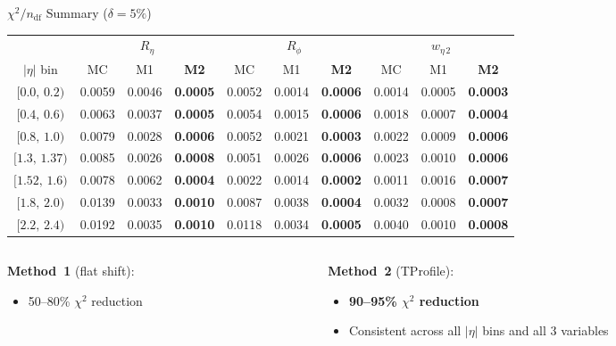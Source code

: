\documentclass[aspectratio=169,10pt]{beamer}
\begin{document}
\begin{frame}{$\chi^2/n_\text{df}$ Summary ($\delta = 5\%$)}

\centering
\small
\begin{tabular}{
  c
  c@{\hskip 6pt}c@{\hskip 6pt}c
  c@{\hskip 6pt}c@{\hskip 6pt}c
  c@{\hskip 6pt}c@{\hskip 6pt}c
}
\toprule
& \multicolumn{3}{c}{$R_\eta$}
& \multicolumn{3}{c}{$R_\phi$}
& \multicolumn{3}{c}{$w_{\eta\,2}$} \\
\cmidrule(lr){2-4}\cmidrule(lr){5-7}\cmidrule(lr){8-10}
$|\eta|$ bin & MC & M1 & \textbf{M2}
             & MC & M1 & \textbf{M2}
             & MC & M1 & \textbf{M2} \\
\midrule
$[0.0,\,0.2)$   & 0.0059 & 0.0046 & \textbf{0.0005} & 0.0052 & 0.0014 & \textbf{0.0006} & 0.0014 & 0.0005 & \textbf{0.0003} \\
$[0.4,\,0.6)$   & 0.0063 & 0.0037 & \textbf{0.0005} & 0.0054 & 0.0015 & \textbf{0.0006} & 0.0018 & 0.0007 & \textbf{0.0004} \\
$[0.8,\,1.0)$   & 0.0079 & 0.0028 & \textbf{0.0006} & 0.0052 & 0.0021 & \textbf{0.0003} & 0.0022 & 0.0009 & \textbf{0.0006} \\
$[1.3,\,1.37)$  & 0.0085 & 0.0026 & \textbf{0.0008} & 0.0051 & 0.0026 & \textbf{0.0006} & 0.0023 & 0.0010 & \textbf{0.0006} \\
$[1.52,\,1.6)$  & 0.0078 & 0.0062 & \textbf{0.0004} & 0.0022 & 0.0014 & \textbf{0.0002} & 0.0011 & 0.0016 & \textbf{0.0007} \\
$[1.8,\,2.0)$   & 0.0139 & 0.0033 & \textbf{0.0010} & 0.0087 & 0.0038 & \textbf{0.0004} & 0.0032 & 0.0008 & \textbf{0.0007} \\
$[2.2,\,2.4)$   & 0.0192 & 0.0035 & \textbf{0.0010} & 0.0118 & 0.0034 & \textbf{0.0005} & 0.0040 & 0.0010 & \textbf{0.0008} \\
\bottomrule
\end{tabular}

\vspace{8pt}
\begin{columns}[T]
\begin{column}{0.48\textwidth}
  \textbf{Method~1} (flat shift):
  \begin{itemize}
    \item 50--80\% $\chi^2$ reduction
  \end{itemize}
\end{column}
\begin{column}{0.48\textwidth}
  \textbf{Method~2} (TProfile):
  \begin{itemize}
    \item \textbf{90--95\% $\chi^2$ reduction}
    \item Consistent across all $|\eta|$ bins and all 3 variables
  \end{itemize}
\end{column}
\end{columns}
\end{frame}
\end{document}
